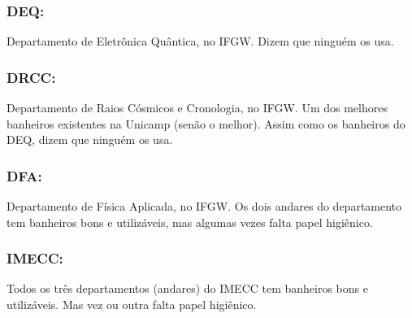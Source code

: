 \subsubsection{DEQ:} Departamento de Eletrônica Quântica, no IFGW. Dizem que
ninguém os usa.

\subsubsection{DRCC:} Departamento de Raios Cósmicos e Cronologia, no IFGW.  Um
dos melhores banheiros existentes na Unicamp (senão o melhor). Assim como os
banheiros do DEQ, dizem que ninguém os usa.

\subsubsection{DFA:} Departamento de Física Aplicada, no IFGW. Os dois andares
do departamento tem banheiros bons e utilizáveis, mas algumas vezes falta papel
higiênico.

\subsubsection{IMECC:} Todos os três departamentos (andares) do IMECC tem
banheiros bons e utilizáveis. Mas vez ou outra falta papel higiênico.
